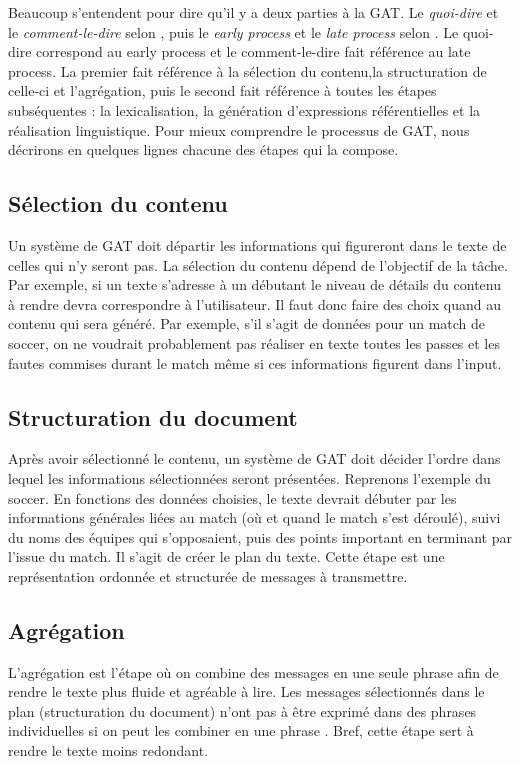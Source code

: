 Beaucoup s'entendent pour dire qu'il y a deux parties à la \ac{GAT}. Le \emph{quoi-dire} et le \emph{comment-le-dire} selon \citep{DanlosPresentationmodelegeneration1983}, puis le \emph{early process} et le \emph{late process} selon \citep{gatt18}. Le quoi-dire correspond au early process et le comment-le-dire fait référence au late process. La premier fait référence à la sélection du contenu,la structuration de celle-ci et l'agrégation, puis le second fait référence à toutes les étapes subséquentes : la lexicalisation, la génération d'expressions référentielles et la réalisation linguistique. Pour mieux comprendre le processus de \ac{GAT}, nous décrirons en quelques lignes chacune des étapes qui la compose.

\subsection{Sélection du contenu}
Un système de \ac{GAT} doit départir les informations qui figureront dans le texte de celles qui n'y seront pas. La sélection du contenu dépend de l'objectif de la tâche. Par exemple, si un texte s'adresse à un débutant le niveau de détails du contenu à rendre devra correspondre à l'utilisateur. Il faut donc faire des choix quand au contenu qui sera généré. Par exemple, s'il s'agit de données pour un match de soccer, on ne voudrait probablement pas réaliser en texte toutes les passes et les fautes commises durant le match même si ces informations figurent dans l'input.

\subsection{Structuration du document}
Après avoir sélectionné le contenu, un système de \ac{GAT} doit décider l'ordre dans lequel les informations sélectionnées seront présentées. Reprenons l'exemple du soccer. En fonctions des données choisies, le texte devrait débuter par les informations générales liées au match (où et quand le match s'est déroulé), suivi du noms des équipes qui s'opposaient, puis des points important en terminant par l'issue du match. Il s'agit de créer le plan du texte. Cette étape est une représentation ordonnée et structurée de messages à transmettre. 

\subsection{Agrégation}
L'agrégation est l'étape où on combine des messages en une seule phrase afin de rendre le texte plus fluide et agréable à lire. Les messages sélectionnés dans le plan (structuration du document) n'ont pas à être exprimé dans des phrases individuelles si on peut les combiner en une phrase \citep{ChengCapturingInteractionAggregation2000}. Bref, cette étape sert à rendre le texte moins redondant.

